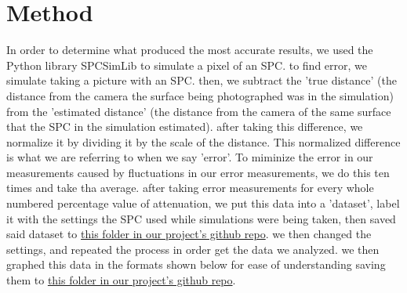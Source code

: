 \documentclass{article}
\begin{document}
\section*{Method}
In order to determine what produced the most accurate results, we used the Python library SPCSimLib \cite{spc} to simulate a pixel of an SPC. to find error, we simulate taking a picture with an SPC. then, we subtract the 'true distance' (the distance from the camera the surface being photographed was in the simulation) from the 'estimated distance' (the distance from the camera of the same surface that the SPC in the simulation estimated). after taking this difference, we normalize it by dividing it by the scale of the distance. This normalized difference is what we are referring to when we say 'error'. To miminize the error in our measurements caused by fluctuations in our error measurements, we do this ten times and take tha average. after taking error measurements for every whole numbered percentage value of attenuation, we put this data into a 'dataset', label it with the settings the SPC used while simulations were being taken, then saved said dataset to \href{https://github.com/yggaraxyg/SPCErrorLowerer/tree/master/RunData/runDataUsedInInitialProject}{this folder in our project's github repo}. we then changed the settings, and repeated the process in order get the data we analyzed. we then graphed this data in the formats shown below for ease of understanding saving them to \href{https://github.com/yggaraxyg/SPCErrorLowerer/tree/master/Graphs}{this folder in our project's github repo}.
\end{document}
